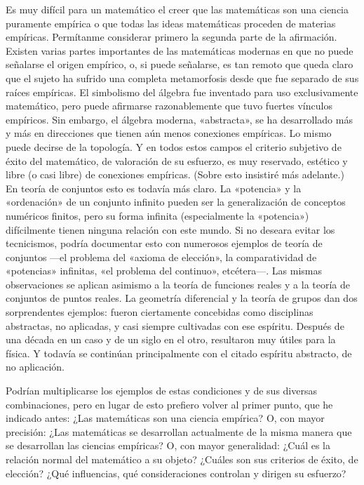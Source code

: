 \documentclass[a4paper, 12pt]{article}
\begin{document}
{Es muy difícil para un matemático el creer que las matemáticas son una ciencia puramente empírica o que todas las ideas matemáticas proceden de materias empíricas. Permítanme considerar primero la segunda parte de la afirmación. Existen varias partes importantes de las matemáticas modernas en que no puede señalarse el origen empírico, o, si puede señalarse, es tan remoto que queda claro que el sujeto ha sufrido una completa metamorfosis desde que fue separado de sus raíces empíricas. El simbolismo del álgebra fue inventado para uso exclusivamente matemático, pero puede afirmarse razonablemente que tuvo fuertes vínculos empíricos. Sin embargo, el álgebra moderna, «abstracta», se ha desarrollado más y más en direcciones que tienen aún menos conexiones empíricas. Lo mismo puede decirse de la topología. Y en todos estos campos el criterio subjetivo de éxito del matemático, de valoración de su esfuerzo, es muy reservado, estético y libre (o casi libre) de conexiones empíricas. (Sobre esto insistiré más adelante.) En teoría de conjuntos esto es todavía más claro. La «potencia» y la «ordenación» de un conjunto infinito pueden ser la generalización de conceptos numéricos finitos, pero su forma infinita (especialmente la «potencia») difícilmente tienen ninguna relación con este mundo. Si no deseara evitar los tecnicismos, podría documentar esto con numerosos ejemplos de teoría de conjuntos ---el problema del «axioma de elección», la comparatividad de «potencias» infinitas, «el problema del continuo», etcétera---. Las mismas observaciones se aplican asimismo a la teoría de funciones reales y a la teoría de conjuntos de puntos reales. La geometría diferencial y la teoría de grupos dan dos sorprendentes ejemplos: fueron ciertamente concebidas como disciplinas abstractas, no aplicadas, y casi siempre cultivadas con ese espíritu. Después de una década en un caso y de un siglo en el otro, resultaron muy útiles para la física. Y todavía se continúan principalmente con el citado espíritu abstracto, de no aplicación.


Podrían multiplicarse los ejemplos de estas condiciones y de sus diversas combinaciones, pero en lugar de esto prefiero volver al primer punto, que he indicado antes: ¿Las matemáticas son una ciencia empírica? O, con mayor precisión: ¿Las matemáticas se desarrollan actualmente de la misma manera que se desarrollan las ciencias empíricas? O, con mayor generalidad: ¿Cuál es la relación normal del matemático a su objeto? ¿Cuáles son sus criterios de éxito, de elección? ¿Qué influencias, qué consideraciones controlan y dirigen su esfuerzo?


}
\end{document}
